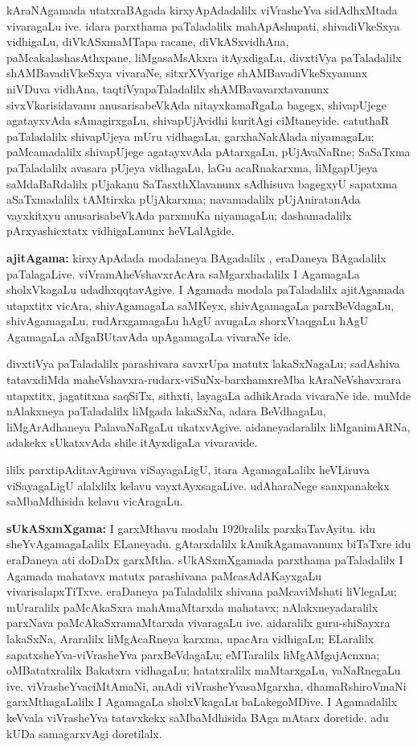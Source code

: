 kAraNAgamada utatxraBAgada kirxyApAdadalilx viVrasheYva sidAdhxMtada vivaragaLu ive. idara parxthama paTaladalilx mahApAshupati, shivadiVkeSxya vidhigaLu, diVkASxmaMTapa racane, diVkASxvidhAna, paMcakalashasAthxpane, liMgasaMsAkxra itAyxdigaLu, divxtiVya paTaladalilx shAMBavadiVkeSxya vivaraNe, sitxrXVyarige shAMBavadiVkeSxyanunx niVDuva vidhAna, taqtiVyapaTaladalilx shAMBavavarxtavanunx sivxVkarisidavanu anusarisabeVkAda nitayxkamaRgaLa bagegx, shivapUjege agatayxvAda sAmagirxgaLu, shivapUjAvidhi kuritAgi ciMtaneyide. catuthaR paTala\-dalilx shivapUjeya mUru vidhagaLu, garxhaNakAlada niyamagaLu; paMcamadalilx shivapUjege agatayxvAda pAtarxgaLu, pUjAvaNaRne; SaSaTxma paTaladalilx avasara pUjeya vidhagaLu, laGu acaRnakarxma, liMgapUjeya saMdaBaRdalilx pUjakanu SaTasxthXlavanunx sAdhisuva bagegxyU sapatxma aSaTxmadalilx tAMtirxka pUjAkarxma; navamadalilx pUjAniratanAda vayxkitxyu anusarisabeVkAda parxmuKa niyamagaLu; dashamadalilx pArxyashicxtatx vidhigaLanunx heVLalAgide.

\textbf{ajitAgama:} kirxyApAdada modalaneya BAgadalilx , eraDaneya BAgadalilx  paTalagaLive. viVramAheVshavxrAcAra saMgarxha\-dalilx I AgamagaLa sholxVkagaLu udadhxqqtavAgive. I Agamada modala paTaladalilx ajitAgamada utapxtitx vicAra, shivAgamagaLa saMKeyx, shivAgamagaLa parxBeVdagaLu, shivAgamagaLu, rudArxgamagaLu hAgU avugaLa shorxVtaqgaLu hAgU AgamagaLa aMgaBUtavAda  upAgamagaLa vivaraNe ide.

divxtiVya paTaladalilx parashivara savxrUpa matutx lakaSxNagaLu; sadAshiva tatavxdiMda maheVshavxra-rudarx-viSuNx-barxhamxreMba kAraNeVshavxrara utapxtitx, jagatitxna saqSiTx, sithxti, layagaLa adhikArada vivaraNe ide. muMde nAlakxneya paTaladalilx liMgada lakaSxNa, adara BeVdhagaLu, liMgArAdhaneya PalavaNaRgaLu ukatxvAgive. aidaneyadaralilx liMganimARNa, adakekx sUkatxvAda shile itAyxdigaLa vivaravide.

ililx parxtipAditavAgiruva viSayagaLigU, itara AgamagaLalilx heVLiruva viSayagaLigU alalxlilx kelavu vayxtAyxsagaLive. udA\-haraNege sanxpanakekx saMbaMdhisida kelavu vicAragaLu.

\textbf{sUkASxmXgama:} I garxMthavu modalu 1920ralilx parxkaTavAyitu. idu sheYvAgamagaLalilx ELaneyadu. gAtarxdalilx kAmikAgamavanunx biTaTxre idu eraDaneya ati doDaDx garxMtha. sUkASxmXgamada parxthama paTaladalilx I Agamada mahatavx matutx parashivana paMca\-sAdAKayxgaLu vivarisalapxTiTxve. eraDaneya paTaladalilx shivana paMcaviMshati liVlegaLu; mUraralilx paMcAkaSxra mahAmaMtarxda mahatavx; nAlakxneyadaralilx parxNava paMcAkaSxramaMtarxda vivaragaLu ive. aidaralilx guru-shiSayxra lakaSxNa, Araralilx liMgAcaRneya karxma, upacAra vidhigaLu; ELaralilx sapatxsheYva-viVrasheYva parxBeVdagaLu; eMTaralilx liMgAMgajAcnxna; oMBatatxralilx Bakatxra vidhagaLu; hatatxralilx maMtarxgaLu, vaNaRnegaLu ive. viVrasheYvaciMtAmaNi, anAdi viVrasheYvasaMgarxha, dhamaRshiroVmaNi garxMthagaLalilx I AgamagaLa sholxVkagaLu baLake\-goMDive. I Agamadalilx keVvala viVrasheYva tatavxkekx saMbaMdhisida BAga mAtarx doretide. adu kUDa samagarxvAgi doretilalx.

